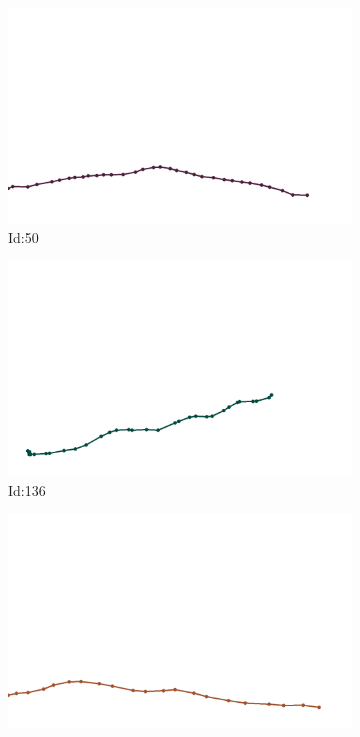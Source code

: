 \documentclass[12pt,twoside]{report}
\begin{document}
\begin{figure}
\centering
\begin{subfigure}[b]{0.20\textwidth}
\centering
\includegraphics[width=\textwidth]{../trajectories/50.png}
\caption{Id:50}
\end{subfigure}
\begin{subfigure}[b]{0.20\textwidth}
\centering
\includegraphics[width=\textwidth]{../trajectories/136.png}
\caption{Id:136}
\end{subfigure}
\begin{subfigure}[b]{0.20\textwidth}
\centering
\includegraphics[width=\textwidth]{../trajectories/184.png}

\end{subfigure}
\end{figure}
\end{document}
